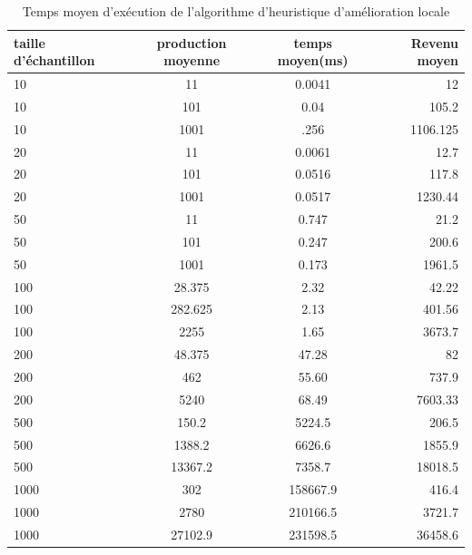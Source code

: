 \documentclass[a4paper, 12pt]{article} %
\begin{document}
\begin{table}[H]
\caption{Temps moyen d'exécution de l'algorithme d'heuristique d'amélioration locale}
\centering
\begin{tabular}{| l | c | c | r |}
\hline
taille d'échantillon & production moyenne & temps moyen(ms)  & Revenu moyen\\
\hline
10 & 11 & 0.0041 & 12\\
\hline
10 & 101 & 0.04 & 105.2\\
\hline
10 & 1001 & .256 & 1106.125\\
\hline
20 & 11 & 0.0061 & 12.7\\
\hline
20 & 101 & 0.0516 & 117.8\\
\hline
20 & 1001 & 0.0517 & 1230.44\\
\hline
50 & 11 & 0.747 & 21.2\\
\hline
50 & 101 & 0.247 & 200.6\\
\hline
50 & 1001 & 0.173 & 1961.5\\
\hline
100 & 28.375 & 2.32 & 42.22\\
\hline
100 & 282.625 & 2.13 & 401.56\\
\hline
100 & 2255 & 1.65 & 3673.7\\
\hline
200 & 48.375 & 47.28 & 82\\
\hline
200 & 462 & 55.60 & 737.9\\
\hline
200 & 5240 & 68.49 & 7603.33\\
\hline
500 & 150.2 & 5224.5 & 206.5\\
\hline
500 & 1388.2 & 6626.6 & 1855.9\\
\hline
500 & 13367.2 & 7358.7 & 18018.5\\
\hline
1000 & 302 & 158667.9 & 416.4\\
\hline
1000 & 2780 & 210166.5 & 3721.7\\
\hline
1000 & 27102.9 & 231598.5 & 36458.6\\
\hline
\end{tabular}
\end{table}
\end{document}
